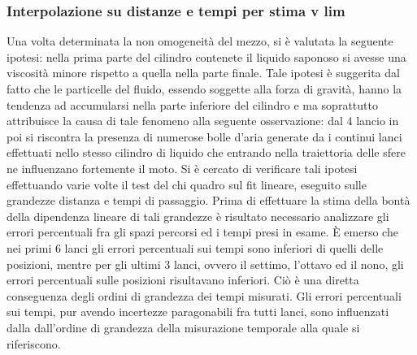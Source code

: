 \documentclass[a4paper,11pt,oneside]{article}
\begin{document}
\subsubsection*{Interpolazione su distanze e tempi per stima v lim}
Una volta determinata la non omogeneità del mezzo, si è valutata la seguente ipotesi: nella prima parte del cilindro contenete il liquido saponoso si avesse una viscosità minore rispetto a quella nella parte finale. Tale ipotesi è suggerita dal fatto che le particelle del fluido, essendo soggette alla forza di gravità, hanno la tendenza ad accumularsi nella parte inferiore del cilindro e ma soprattutto attribuisce la causa di tale fenomeno alla seguente osservazione: dal 4 lancio in poi si riscontra la presenza di numerose bolle d'aria generate da i continui lanci effettuati nello stesso cilindro di liquido che entrando nella traiettoria delle sfere ne influenzano fortemente il moto.\newline
Si è cercato di verificare tali ipotesi effettuando varie volte il test del chi quadro sul fit lineare, eseguito sulle grandezze distanza e tempi di passaggio.
Prima di effettuare la stima della bontà della dipendenza lineare di tali grandezze è risultato necessario analizzare gli errori percentuali fra gli spazi percorsi ed i tempi presi in esame. È emerso che nei primi 6 lanci gli errori percentuali sui tempi sono inferiori di quelli delle posizioni, mentre per gli ultimi 3 lanci, ovvero il settimo, l'ottavo ed il nono, gli errori percentuali sulle posizioni risultavano inferiori. Ciò è una diretta conseguenza degli ordini di grandezza dei tempi misurati. Gli errori percentuali sui tempi, pur avendo incertezze paragonabili fra tutti lanci, sono influenzati dalla dall'ordine di grandezza della misurazione temporale alla quale si riferiscono.
\end{document}
